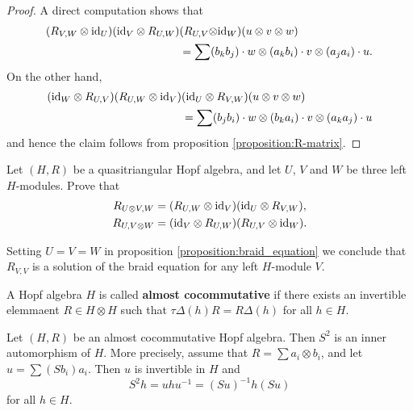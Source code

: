 \begin{proof}
A direct computation shows that
\begin{align*}
(R_{V,W}\otimes\mathrm{id}_{U})(\mathrm{id}_{V}\otimes R_{U,W}) & (R_{U,V}\mathrm{\otimes id}_{W})(u\otimes v\otimes w)\\
 & =\sum(b_{k}b_{j})\cdot w\otimes(a_{k}b_{i})\cdot v\otimes(a_{j}a_{i})\cdot u.
\end{align*}
On the other hand,
\begin{align*}
(\mathrm{id}_{W}\otimes R_{U,V})(R_{U,W}\otimes\mathrm{id}_{V}) & (\mathrm{id}_{U}\otimes R_{V,W})(u\otimes v\otimes w)\\
 & =\sum(b_{j}b_{i})\cdot w\otimes(b_{k}a_{i})\cdot v\otimes(a_{k}a_{j})\cdot u
\end{align*}
and hence the claim follows from proposition \ref{proposition:R-matrix}.\end{proof}

\begin{exercise}
\label{exercise:QT_hexagons}
Let $(H,R)$ be a quasitriangular Hopf algebra, and let $U$, $V$ and $W$
be three left $H$-modules. Prove that 
\begin{align}
R_{U\otimes V,W} & =(R_{U,W}\otimes\id_{V})(\id_{U}\otimes R_{V,W}),\label{eq:(Rx1)(1xR)}\\
R_{U,V\otimes W} & =(\id_{V}\otimes R_{U,W})(R_{U,V}\otimes\id_{W}).\label{eq:(1xR)(Rx1)}
\end{align}
\end{exercise}

Setting $U=V=W$ in proposition \ref{proposition:braid_equation} we conclude that
$R_{V,V}$ is a solution of the braid equation for any left $H$-module $V$. 

\begin{definition}
A Hopf algebra $H$ is called \textbf{almost cocommutative} if there exists
an invertible elemmaent $R\in H\otimes H$ such that $\tau\Delta(h)R=R\Delta(h)$
for all $h\in H$.
\end{definition}

\begin{proposition}
Let $(H,R)$ be an almost cocommutative Hopf algebra. Then $S^2$ is an inner
automorphism of $H$. More precisely, assume that $R=\sum a_i\otimes b_i$, and
let $u=\sum (Sb_i)a_i$. Then $u$ is invertible in $H$ and
\[
S^2h=uhu^{-1}=(Su)^{-1}h(Su)
\]
for all $h\in H$.
\end{proposition}

